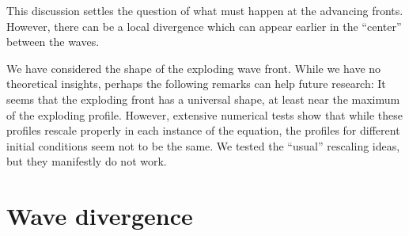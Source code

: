 \documentclass[12pt,a4paper]{article}
\numberwithin{equation}{section}
\theoremstyle{definition} %
\begin{document}
This discussion settles the question of what must happen at the
advancing fronts. However, there can be a local divergence which can
appear earlier in the ``center'' between the waves.

We have considered the shape of the exploding wave front. While we
have no theoretical insights, perhaps the following remarks can help
future research: It seems that the exploding front has a universal
shape, at least near the maximum of the exploding profile.
However, extensive numerical tests show that while these profiles rescale
properly in each instance of the equation, the profiles for
different initial conditions seem not to be the same. We tested the ``usual''
rescaling ideas, but they manifestly do not work.






\section{Wave divergence}
\end{document}
